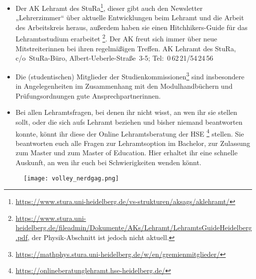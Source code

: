 \begin{itemize}
\item Der AK Lehramt des StuRa\footnote{\url{https://www.stura.uni-heidelberg.de/vs-strukturen/aksags/aklehramt/}}, dieser gibt auch den Newsletter „Lehrerzimmer“ über aktuelle Entwicklungen beim Lehramt und die Arbeit des Arbeitskreis heraus, außerdem haben sie einen Hitchhikers-Guide für das Lehramtsstudium erarbeitet \footnote{\url{https://www.stura.uni-heidelberg.de/fileadmin/Dokumente/AKs/Lehramt/LehramtsGuideHeidelberg.pdf}, der Physik-Abschnitt ist jedoch nicht aktuell.}. Der AK freut sich immer über neue Mitstreiterinnen bei ihren regelmäßigen Treffen.  \newline AK Lehramt des StuRa, c/o~StuRa-Büro, Albert-Ueberle-Straße~3-5; Tel:~0\,62\,21/54\,24\,56

\item Die (studentischen) Mitglieder der Studienkommissionen\footnote{\url{https://mathphys.stura.uni-heidelberg.de/w/en/gremienmitglieder/}} sind insbesondere in Angelegenheiten im Zusammenhang mit den Modulhandbüchern und Prüfungsordnungen gute Ansprechpartnerinnen.

\item Bei allen Lehramtsfragen, bei denen ihr nicht wisst, an wen ihr sie stellen sollt, oder die sich aufs Lehramt beziehen und bisher niemand beantworten konnte, könnt ihr diese der Online Lehramtsberatung der HSE \footnote{\url{https://onlineberatunglehramt.hse-heidelberg.de/}} stellen. Sie beantworten euch alle Fragen zur Lehramtsoption im Bachelor, zur Zulassung zum Master und zum Master of Education. Hier erhaltet ihr eine schnelle Auskunft, an wen ihr euch bei Schwierigkeiten wenden könnt.


\end{itemize}



\begin{figure}[h]
\texttt{[image: volley\_nerdgag.png]}

\end{figure}

